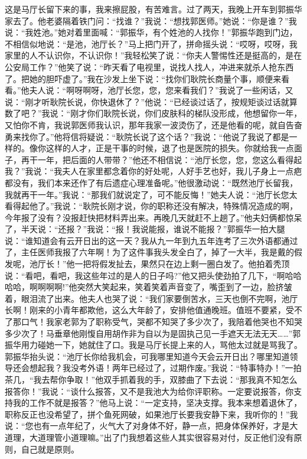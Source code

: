 \documentclass[12pt,oneside]{book}
\begin{document}
这是马厅长留下来的事，我来擦屁股，有苦难言。过了两天，我晚上开车到郭振华家去了。他老婆隔着铁门问：``找谁？''我说：``想找郭医师。''她说：``你是谁？''我说：``我姓池。''她对着里面喊：``郭振华，有个姓池的人找你！''郭振华跑到门边，不相信似地说：``是池，池厅长？''马上把门开了，拼命摇头说：``哎呀，哎呀，我家里的人不认识你，不认识你！''我轻松笑了说：``你夫人警惕性还是挺高的，是在公安局工作？''他笑了说：``昨天看了电视里，说找人找人，冲进来就杀人抢东西了。把她的胆吓虚了。''我在沙发上坐下说：``找你们耿院长商量个事，顺便来看看。''他夫人说：``啊呀啊呀，池厅长您，您，您来看我们？''我说了一些闲话，又说：``刚才听耿院长说，你快退休了？''他说：``已经谈过话了，按规矩谈过话就算数了吧？''我说：``刚才你们耿院长说，你们皮肤科的梯队没形成，他想留你一年，又怕你不肯，我说郭医师我认识，那年我家一波烫伤了，还是他看的呢，就自告奋勇来找你了。''他将信将疑说：``耿院长说了这个话？''我说：``他说了我说了都是一样的。像你这样的人才，正是干事的时候，退了也是医院的损失。你就给我一点面子，再干一年，把后面的人带带？''他还不相信说：``池厅长您，您，您这么看得起我？''我说：``我夫人在家里都念着你的好处呢，人好手艺也好，我儿子身上一点疤都没有，我们本来还作了有后遗症心理准备呢。''他很激动说：``既然池厅长留我，我就再干一年。''我说：``那我们就说定了，可不能反悔！''她夫人说：``池厅长您太看得起他了。''我说：``耿院长刚才说，你的职称还没有解决，特殊情况造成的啊，今年报了没有？没报赶快把材料弄出来。再晚几天就赶不上趟了。''他夫妇俩都惊呆了，半天说：``还报？''我说：``报！我说能报，谁说不能报？''郭振华一拍大腿说：``谁知道会有云开日出的这一天？我从九一年到九五年连考了三次外语都通过了，主任医师我报了六年啊！为了这件事我头发全白了，掉了一大半，我是戴的假发呢，池厅长！''他一把将假发扯去，果然只在边上剩一圈白发了。他拍着秃顶说：``看吧，看吧，我这些年过的是人的日子吗?''他又把头使劲拍了几下，``啊哈哈哈哈，啊啊啊啊!''他突然大笑起来，笑着笑着声音变了，嘴歪到了一边，脸挤皱着，眼泪流了出来。他夫人也哭了说：``我们家要倒苦水，三天也倒不完啊，池厅长啊！刚来的小青年都欺他，这么大年龄了，安排他值通晚班。值班不要紧，受不了那口气！我家老郭为了职称受气，哭都不知哭了多少次了，我陪着他哭也不知哭多少次了！马垂章他刚愎自用胡作非为自以为是固执己见一手遮天无法无天\ldots\ldots{}''郭振华用力碰她一下，她就住了口。我是马厅长提上来的人，骂他太过就是骂我了。郭振华抬头说：``池厅长你给我机会，可我哪里知道今天会云开日出？哪里知道领导还会想起我？我没考外语！两年已经过了，过期作废。''我说：``特事特办！''一拍茶几，``我去帮你争取！''他双手抓着我的手，双膝曲了下去说：``那我真不知怎么报答你！''我说：``谈什么报答，又不是我池大为给你评职称。一定要说报答，你支持我的工作不就是报答？''他马上说：``一定支持，坚决支撑。我本来想着退休了，职称反正也没希望了，拼个鱼死网破，如果池厅长要我安静下来，我听你的！''我说：``您也有一点年纪了，火气大了对身体不好，静一点，把身体保养好，才是大道理，大道理管小道理嘛。''出了门我想着这些人其实很容易对付，反正他们没有原则，自己就是原则。
\end{document}
